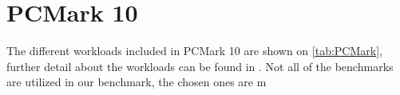 \section{PCMark 10}
The different workloads included in PCMark 10 are shown on \cref{tab:PCMark}, further detail about the workloads can be found in \cite{pcmark}. Not all of the benchmarks are utilized in our benchmark, the chosen ones are m

